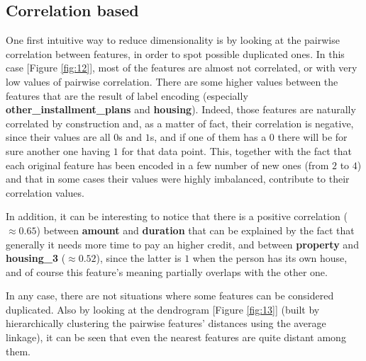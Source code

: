 \documentclass[letterpaper]{article}
\begin{document}
	\subsection{Correlation based}
	One first intuitive way to reduce dimensionality is by looking at the pairwise correlation between features, in order to spot possible duplicated ones. In this case [Figure \ref{fig:12}], most of the features are almost not correlated, or with very low values of pairwise correlation. There are some higher values between the features that are the result of label encoding (especially \textbf{other\_installment\_plans} and \textbf{housing}). Indeed, those features are naturally correlated by construction and, as a matter of fact, their correlation is negative, since their values are all $0$s and $1$s, and if one of them has a $0$ there will be for sure another one having $1$ for that data point. This, together with the fact that each original feature has been encoded in a few number of new ones (from $2$ to $4$) and that in some cases their values were highly imbalanced, contribute to their correlation values. 
	\par In addition, it can be interesting to notice that there is a positive correlation ($\approx 0.65$) between \textbf{amount} and \textbf{duration} that can be explained by the fact that generally it needs more time to pay an higher credit, and between \textbf{property} and \textbf{housing\_3} ($\approx 0.52$), since the latter is $1$ when the person has its own house, and of course this feature's meaning partially overlaps with the other one.
	\par In any case, there are not situations where some features can be considered duplicated. Also by looking at the dendrogram [Figure \ref{fig:13}] (built by hierarchically clustering the pairwise features' distances using the average linkage), it can be seen that even the nearest features are quite distant among them.  
	
\end{document}
